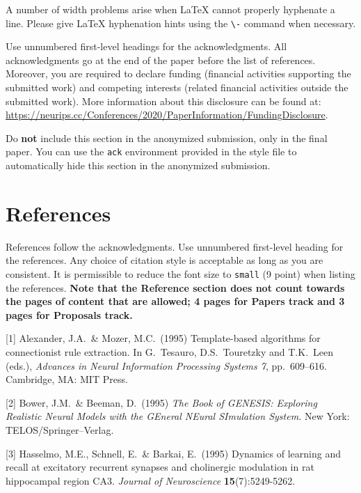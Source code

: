 \documentclass{article}
\begin{document}
A number of width problems arise when \LaTeX{} cannot properly hyphenate a
line. Please give LaTeX hyphenation hints using the \verb+\-+ command when
necessary.

\begin{ack}
Use unnumbered first-level headings for the acknowledgments. All acknowledgments
go at the end of the paper before the list of references. Moreover, you are required to declare 
funding (financial activities supporting the submitted work) and competing interests (related financial activities outside the submitted work). 
More information about this disclosure can be found at: \url{https://neurips.cc/Conferences/2020/PaperInformation/FundingDisclosure}.


Do {\bf not} include this section in the anonymized submission, only in the final paper. You can use the \texttt{ack} environment provided in the style file to automatically hide this section in the anonymized submission.
\end{ack}

\section*{References}

References follow the acknowledgments. Use unnumbered first-level heading for
the references. Any choice of citation style is acceptable as long as you are
consistent. It is permissible to reduce the font size to \verb+small+ (9 point)
when listing the references.
{\bf Note that the Reference section does not count towards the pages of content that are allowed; 4 pages for Papers track and 3 pages for Proposals track.}
\medskip

\small

[1] Alexander, J.A.\ \& Mozer, M.C.\ (1995) Template-based algorithms for
connectionist rule extraction. In G.\ Tesauro, D.S.\ Touretzky and T.K.\ Leen
(eds.), {\it Advances in Neural Information Processing Systems 7},
pp.\ 609--616. Cambridge, MA: MIT Press.

[2] Bower, J.M.\ \& Beeman, D.\ (1995) {\it The Book of GENESIS: Exploring
  Realistic Neural Models with the GEneral NEural SImulation System.}  New York:
TELOS/Springer--Verlag.

[3] Hasselmo, M.E., Schnell, E.\ \& Barkai, E.\ (1995) Dynamics of learning and
recall at excitatory recurrent synapses and cholinergic modulation in rat
hippocampal region CA3. {\it Journal of Neuroscience} {\bf 15}(7):5249-5262.
\end{document}
